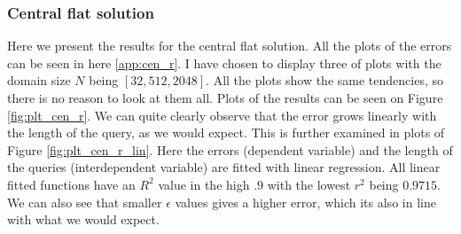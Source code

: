 \documentclass[11pt]{article}
\theoremstyle{definition}
\begin{document}
\subsubsection{Central flat solution}
Here we present the results for the central flat solution. All the plots of the errors can be seen in here \ref{app:cen_r}. I have chosen to display three of plots with the domain size $N$ being $[32,512,2048]$. All the plots show the same tendencies, so there is no reason to look at them all. Plots of the results can be seen on Figure \ref{fig:plt_cen_r}. We can quite clearly observe that the error grows linearly with the length of the query, as we would expect. This is further examined in plots of Figure \ref{fig:plt_cen_r_lin}. Here the errors (dependent variable) and the length of the queries (interdependent variable) are fitted with linear regression. All linear fitted functions have an $R^2$ value in the high $.9$ with the lowest $r^2$ being $0.9715$.  We can also see that smaller $\epsilon$ values gives a higher error, which its also in line with what we would expect.
\end{document}
